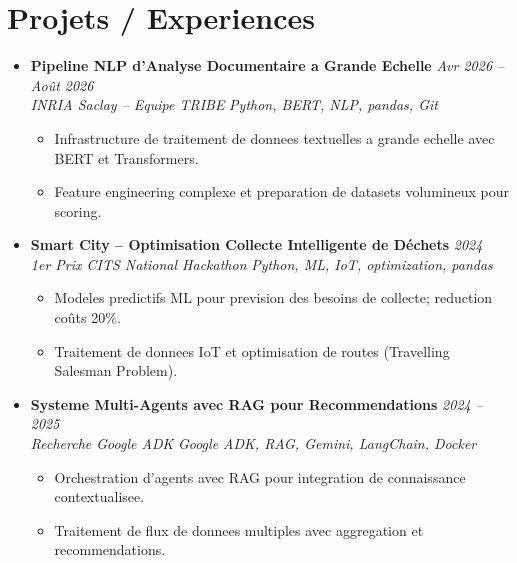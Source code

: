 \documentclass[a4paper,11pt]{article}
\begin{document}
\section{Projets / Experiences}
\begin{itemize}[leftmargin=*, label={-}]

\item \textbf{Pipeline NLP d'Analyse Documentaire a Grande Echelle} \hfill \textit{Avr 2026 -- Ao\^ut 2026} \\
\textit{INRIA Saclay -- Equipe TRIBE} \hfill \textit{Python, BERT, NLP, pandas, Git}
\vspace{-2pt}
    \begin{itemize}[leftmargin=0.4cm, nosep, label=\tiny$\bullet$]
        \item \small{Infrastructure de traitement de donnees textuelles a grande echelle avec BERT et Transformers.}
        \item \small{Feature engineering complexe et preparation de datasets volumineux pour scoring.}
    \end{itemize}
\vspace{3pt}

\item \textbf{Smart City -- Optimisation Collecte Intelligente de Déchets} \hfill \textit{2024} \\
\textit{1er Prix CITS National Hackathon} \hfill \textit{Python, ML, IoT, optimization, pandas}
\vspace{-2pt}
    \begin{itemize}[leftmargin=0.4cm, nosep, label=\tiny$\bullet$]
        \item \small{Modeles predictifs ML pour prevision des besoins de collecte; reduction coûts 20\%.}
        \item \small{Traitement de donnees IoT et optimisation de routes (Travelling Salesman Problem).}
    \end{itemize}
\vspace{3pt}

\item \textbf{Systeme Multi-Agents avec RAG pour Recommendations} \hfill \textit{2024 -- 2025} \\
\textit{Recherche Google ADK} \hfill \textit{Google ADK, RAG, Gemini, LangChain, Docker}
\vspace{-2pt}
    \begin{itemize}[leftmargin=0.4cm, nosep, label=\tiny$\bullet$]
        \item \small{Orchestration d'agents avec RAG pour integration de connaissance contextualisee.}
        \item \small{Traitement de flux de donnees multiples avec aggregation et recommendations.}
    \end{itemize}
\vspace{3pt}


\end{itemize}
\end{document}
